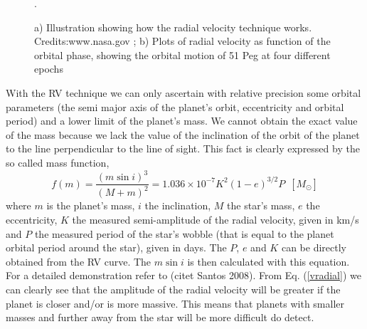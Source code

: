 \documentclass[dvips,12pt,a4paper]{report}
\begin{document}
\begin{figure}[h]
\centering
{}
\caption[The RV Technique illustration and plots]{a) Illustration showing how the radial velocity technique works. Credits:www.nasa.gov ; b) Plots of radial velocity as function of the orbital phase, showing the orbital motion of 51 Peg at four different epochs \citep{Mayor-1995}}.
\label{rvpic}
\end{figure}

With the RV technique we can only ascertain with relative precision some orbital parameters (the semi major axis of the planet's orbit, eccentricity and orbital period) and a lower limit of the planet's mass. We cannot obtain the exact value of the mass because we lack the value of the inclination of the orbit of the planet to the line perpendicular to the line of sight. This fact is clearly expressed by the so called mass function,
\begin{equation}
 f(m)=\frac{(m \sin i)^3}{(M+m)^2}=1.036\times10^{-7}K^2(1-e)^{3/2}P\,\,\, [M_\odot]
\label {vradial}
\end{equation}
where $m$ is the planet's mass, $i$ the inclination, $M$ the star's mass, $e$ the eccentricity, $K$ the measured semi-amplitude of the radial velocity, given in km/s and $P$ the measured period of the star's wobble (that is equal to the planet orbital period around the star), given in days. The $P$, $e$ and $K$ can be directly obtained from the RV curve. The $m \sin i$ is then calculated with this equation. For a detailed demonstration refer to (citet Santos 2008). From Eq. (\ref{vradial}) we can clearly see that the amplitude of the radial velocity will be greater if the planet is closer and/or is more massive. This means that planets with smaller masses and further away from the star will be more difficult do detect. 
\end{document}
